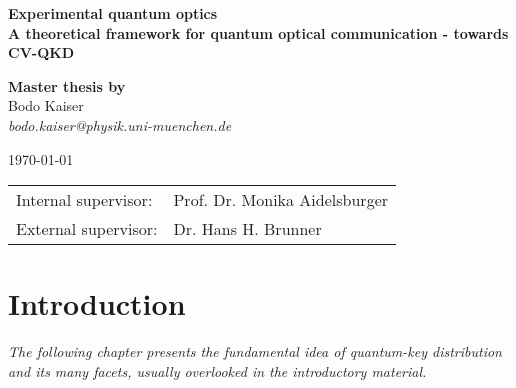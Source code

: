\documentclass[
	a4paper,
	parskip,
	appendixprefix,
	chapterprefix,
	headings=big,
]{scrreprt}
\theoremstyle{definition}
\theoremstyle{remark}
\numberwithin{equation}{section}
\begin{document}
	\begin{titlepage}
		\begin{center}
			\large
   		    \textbf{\textsf{Experimental quantum optics}}\\
		    \vspace{0.8em}
			\huge
		    \textbf{\textsf{A theoretical framework for quantum optical communication - towards CV-QKD}}\\
			
			\vspace{1.2em}
			\begin{figure}[htb]
				\centering
			    
			\end{figure}
			
			\vspace{.6em}
		    \large
		    \textbf{Master thesis by}\\
			\vspace{.8em}
		    \large
			Bodo Kaiser\\
		    \vspace{.2em}
			\textit{bodo.kaiser@physik.uni-muenchen.de}

		    \large
		    \today

		    \vspace{1.9em}
			\normalsize
			\begin{tabular}{ll}
			Internal supervisor: & Prof. Dr. Monika Aidelsburger \\
			External supervisor: & Dr. Hans H. Brunner \\
			\end{tabular}
		\end{center}
	\end{titlepage}
	\tableofcontents

	\chapter{Introduction}
	\begin{refsection}
		\textit{The following chapter presents the fundamental idea of quantum-key distribution and its many facets, usually overlooked in the introductory material.}
        
        
        
        
        
	
		\printbibliography[title=References]
	\end{refsection}
	
\end{document}
